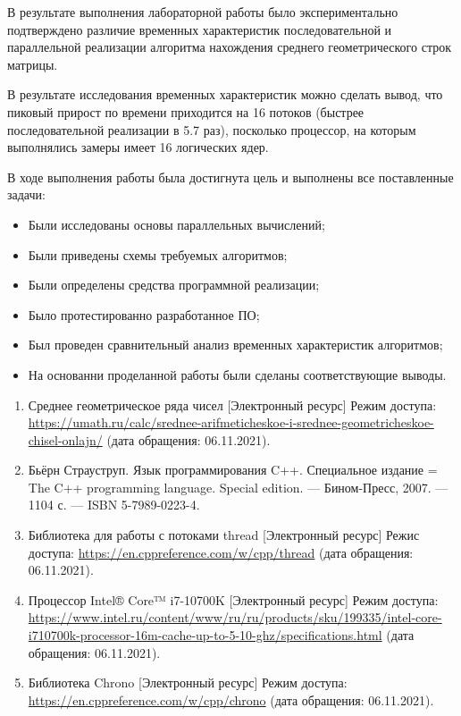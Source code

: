 
В результате выполнения лабораторной работы было экспериментально подтверждено различие временных характеристик последовательной и параллельной реализации алгоритма нахождения среднего геометрического строк матрицы.

В результате исследования временных характеристик можно сделать вывод, что пиковый прирост по времени приходится на 16 потоков (быстрее последовательной реализации в 5.7 раз), посколько процессор, на которым выполнялись замеры имеет 16 логических ядер.

В ходе выполнения работы была достигнута цель и выполнены все поставленные задачи:

\begin{itemize}
    \item Были исследованы основы параллельных вычислений;
    \item Были приведены схемы требуемых алгоритмов;
    \item Были определены средства программной реализации;
    \item Было протестированно разработанное ПО;
    \item Был проведен сравнительный анализ временных характеристик алгоритмов;
    \item На основанни проделанной работы были сделаны соответствующие выводы.
\end{itemize}


\begin{enumerate}
    \item Среднее геометрическое ряда чисел [Электронный ресурс] Режим доступа: \url{https://umath.ru/calc/srednee-arifmeticheskoe-i-srednee-geometricheskoe-chisel-onlajn/} (дата обращения: 06.11.2021).
    \item Бьёрн Страуструп. Язык программирования C++. Специальное издание = The C++ programming language. Special edition. — Бином-Пресс, 2007. — 1104 с. — ISBN 5-7989-0223-4.
    \item Библиотека для работы с потоками thread [Электронный ресурс] Режис доступа: \url{https://en.cppreference.com/w/cpp/thread} (дата обращения: 06.11.2021).
    \item Процессор Intel® Core™ i7-10700K [Электронный ресурс] Режим доступа: \url{https://www.intel.ru/content/www/ru/ru/products/sku/199335/intel-core-i710700k-processor-16m-cache-up-to-5-10-ghz/specifications.html} (дата обращения: 06.11.2021).
    \item Библиотека Chrono [Электронный ресурс] Режим доступа: \url{https://en.cppreference.com/w/cpp/chrono} (дата обращения: 06.11.2021).
\end{enumerate}

